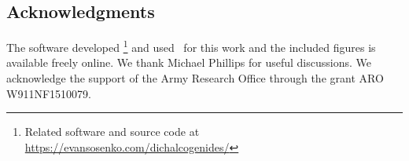 \begin{acknowledgments}
  \section{Acknowledgments}

  The software developed %
\footnote{%
  Related software and source code at \\
  \url{https://evansosenko.com/dichalcogenides/}
}
  and used~\cite{Hunter:2007} for this work
  and the included figures is available freely online.
  We thank Michael Phillips for useful discussions.
  We acknowledge the support of the Army Research Office through the grant
  ARO W911NF1510079.
\end{acknowledgments}
